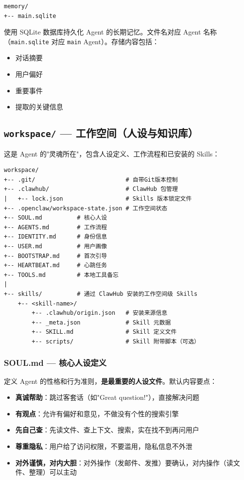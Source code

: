\begin{lstlisting}
memory/
+-- main.sqlite
\end{lstlisting}

使用 SQLite 数据库持久化 Agent 的长期记忆。文件名对应 Agent 名称（\texttt{main.sqlite} 对应 \texttt{main} Agent）。存储内容包括：

\begin{itemize}
  \item 对话摘要
  \item 用户偏好
  \item 重要事件
  \item 提取的关键信息
\end{itemize}

\subsection{\texttt{workspace/} --- 工作空间（人设与知识库）}


这是 Agent 的"灵魂所在"，包含人设定义、工作流程和已安装的 Skills：

\begin{lstlisting}
workspace/
+-- .git/                          # 自带Git版本控制
+-- .clawhub/                      # ClawHub 包管理
|   +-- lock.json                  # Skills 版本锁定文件
+-- .openclaw/workspace-state.json # 工作空间状态
+-- SOUL.md          # 核心人设
+-- AGENTS.md        # 工作流程
+-- IDENTITY.md      # 身份信息
+-- USER.md          # 用户画像
+-- BOOTSTRAP.md     # 首次引导
+-- HEARTBEAT.md     # 心跳任务
+-- TOOLS.md         # 本地工具备忘
|
+-- skills/          # 通过 ClawHub 安装的工作空间级 Skills
    +-- <skill-name>/
        +-- .clawhub/origin.json   # 安装来源信息
        +-- _meta.json             # Skill 元数据
        +-- SKILL.md               # Skill 定义文件
        +-- scripts/               # Skill 附带脚本（可选）
\end{lstlisting}

\subsubsection{SOUL.md --- 核心人设定义}


定义 Agent 的性格和行为准则，\textbf{是最重要的人设文件}。默认内容要点：

\begin{itemize}
  \item \textbf{真诚帮助}：跳过客套话（如"Great question!"），直接解决问题
  \item \textbf{有观点}：允许有偏好和意见，不做没有个性的搜索引擎
  \item \textbf{先自己查}：先读文件、查上下文、搜索，实在找不到再问用户
  \item \textbf{尊重隐私}：用户给了访问权限，不要滥用，隐私信息不外泄
  \item \textbf{对外谨慎，对内大胆}：对外操作（发邮件、发推）要确认，对内操作（读文件、整理）可以主动
\end{itemize}

